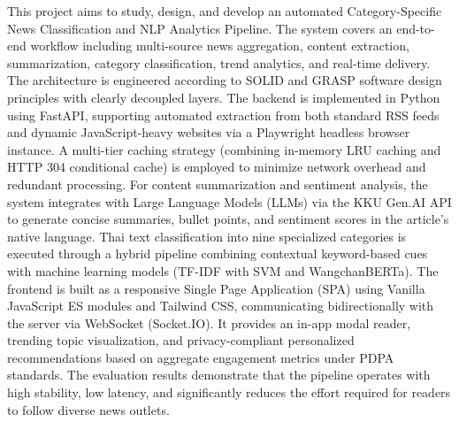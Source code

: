 This project aims to study, design, and develop an automated Category-Specific News Classification and NLP Analytics Pipeline. The system covers an end-to-end workflow including multi-source news aggregation, content extraction, summarization, category classification, trend analytics, and real-time delivery. The architecture is engineered according to SOLID and GRASP software design principles with clearly decoupled layers. The backend is implemented in Python using FastAPI, supporting automated extraction from both standard RSS feeds and dynamic JavaScript-heavy websites via a Playwright headless browser instance. A multi-tier caching strategy (combining in-memory LRU caching and HTTP 304 conditional cache) is employed to minimize network overhead and redundant processing. For content summarization and sentiment analysis, the system integrates with Large Language Models (LLMs) via the KKU Gen.AI API to generate concise summaries, bullet points, and sentiment scores in the article's native language. Thai text classification into nine specialized categories is executed through a hybrid pipeline combining contextual keyword-based cues with machine learning models (TF-IDF with SVM and WangchanBERTa). The frontend is built as a responsive Single Page Application (SPA) using Vanilla JavaScript ES modules and Tailwind CSS, communicating bidirectionally with the server via WebSocket (Socket.IO). It provides an in-app modal reader, trending topic visualization, and privacy-compliant personalized recommendations based on aggregate engagement metrics under PDPA standards. The evaluation results demonstrate that the pipeline operates with high stability, low latency, and significantly reduces the effort required for readers to follow diverse news outlets.